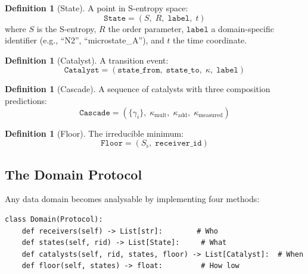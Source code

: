 \documentclass[11pt,a4paper]{article}
\theoremstyle{definition}
\newtheorem{definition}[theorem]{Definition}
\theoremstyle{remark}
\newcommand{\Sfloor}{S_{\flat}}
\newcommand{\Rorder}{R}
\begin{document}
\begin{definition}[State]
A point in S-entropy space:
\begin{equation}
\mathtt{State} = (S,\; \Rorder,\; \mathtt{label},\; t)
\end{equation}
where $S$ is the S-entropy, $\Rorder$ the order parameter, $\mathtt{label}$ a domain-specific identifier (e.g., ``N2'', ``microstate\_A''), and $t$ the time coordinate.
\end{definition}

\begin{definition}[Catalyst]
A transition event:
\begin{equation}
\mathtt{Catalyst} = (\mathtt{state\_from},\; \mathtt{state\_to},\; \kappa,\; \mathtt{label})
\end{equation}
\end{definition}

\begin{definition}[Cascade]
A sequence of catalysts with three composition predictions:
\begin{equation}
\mathtt{Cascade} = (\{\gamma_i\},\; \kappa_{\mathrm{mult}},\; \kappa_{\mathrm{add}},\; \kappa_{\mathrm{measured}})
\end{equation}
\end{definition}

\begin{definition}[Floor]
The irreducible minimum:
\begin{equation}
\mathtt{Floor} = (\Sfloor,\; \mathtt{receiver\_id})
\end{equation}
\end{definition}

\subsection{The Domain Protocol}

Any data domain becomes analysable by implementing four methods:

\begin{tcolorbox}[colback=gray!5,colframe=gray!50,title=Domain Protocol]
\begin{lstlisting}[style=python,numbers=none]
class Domain(Protocol):
    def receivers(self) -> List[str]:        # Who
    def states(self, rid) -> List[State]:     # What
    def catalysts(self, rid, states, floor) -> List[Catalyst]:  # When
    def floor(self, states) -> float:         # How low
\end{lstlisting}
\end{tcolorbox}
\end{document}
